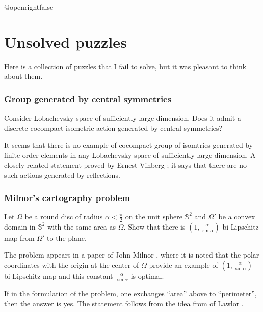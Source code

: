 \csname @openrightfalse\endcsname
\chapter{Unsolved puzzles}

Here is a collection of puzzles that I fail to solve,
but it was pleasant to think about them.

\subsection*{Group generated by central symmetries}
\label{Group generated by central symmetries}

\begin{pr}
Consider Lobachevsky space of sufficiently large dimension.
Does it admit a discrete cocompact isometric action generated by central symmetries?
\end{pr}

It seems that there is no example of cocompact group of isomtries generated by finite order elements in any Lobachevsky space of sufficiently large dimension.
A closely related statement proved by Ernest Vinberg \cite[see][]{vinberg, vinberg-strong};
it says that there are no such actions generated by reflections.

\subsection*{Milnor's cartography problem}
\label{Milnor's cartography problem}

\begin{pr}
Let $\Omega$ be a round disc of radius $\alpha<\tfrac\pi2$ on the unit sphere $\mathbb{S}^2$
and $\Omega'$ be a convex domain in $\mathbb{S}^2$ with the same area as $\Omega$. Show that there is $(1,\tfrac{\alpha}{\sin\alpha})$-bi-Lipschitz map from $\Omega'$ to the plane.
\end{pr}

The problem appears in a paper of John Milnor \cite[see][]{milnor-cartography},
where it is noted that the polar coordinates with the origin at the center of $\Omega$ provide an example of $(1,\tfrac{\alpha}{\sin\alpha})$-bi-Lipschitz map and this constant $\tfrac{\alpha}{\sin\alpha}$ is optimal.

If in the formulation of the problem, one exchanges ``area''  above to ``perimeter'',
then the answer is yes. The statement follows from the idea from of Lawlor \cite[see][]{lawlor}.

